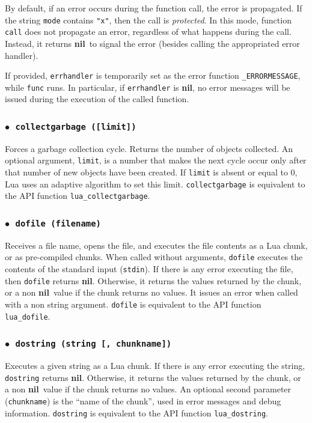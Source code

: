 \documentclass[11pt]{article}
\newcommand{\T}[1]{{\tt #1}}
\newcommand{\nil}{{\bf nil}}
\newcommand{\Deffunc}[1]{\index{#1}}
\newcommand{\ff}{$\bullet$\ }
\begin{document}
By default,
if an error occurs during the function call,
the error is propagated.
If the string \verb|mode| contains \verb|"x"|,
then the call is \emph{protected}.
In this mode, function \verb|call| does not propagate an error,
regardless of what happens during the call.
Instead, it returns \nil\ to signal the error
(besides calling the appropriated error handler).

If provided,
\verb|errhandler| is temporarily set as the error function
\verb|_ERRORMESSAGE|, while \verb|func| runs.
In particular, if \verb|errhandler| is \nil,
no error messages will be issued during the execution of the called function.

\subsubsection*{\ff \T{collectgarbage ([limit])}}\Deffunc{collectgarbage}
Forces a garbage collection cycle.
Returns the number of objects collected.
An optional argument, \verb|limit|, is a number that
makes the next cycle occur only after that number of new
objects have been created.
If \verb|limit| is absent or equal to 0,
Lua uses an adaptive algorithm to set this limit.
\verb|collectgarbage| is equivalent to
the API function \verb|lua_collectgarbage|.

\subsubsection*{\ff \T{dofile (filename)}}\Deffunc{dofile}
Receives a file name,
opens the file, and executes the file contents as a Lua chunk,
or as pre-compiled chunks.
When called without arguments,
\verb|dofile| executes the contents of the standard input (\verb|stdin|).
If there is any error executing the file,
then \verb|dofile| returns \nil.
Otherwise, it returns the values returned by the chunk,
or a non \nil\ value if the chunk returns no values.
It issues an error when called with a non string argument.
\verb|dofile| is equivalent to the API function \verb|lua_dofile|.

\subsubsection*{\ff \T{dostring (string [, chunkname])}}\Deffunc{dostring}
Executes a given string as a Lua chunk.
If there is any error executing the string,
\verb|dostring| returns \nil.
Otherwise, it returns the values returned by the chunk,
or a non \nil\ value if the chunk returns no values.
An optional second parameter (\verb|chunkname|)
is the ``name of the chunk'',
used in error messages and debug information.
\verb|dostring| is equivalent to the API function \verb|lua_dostring|.
\end{document}
